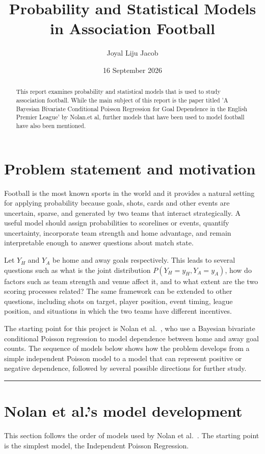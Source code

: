 \documentclass[11pt,a4paper]{amsart}
\title{Probability and Statistical Models in Association Football}
\author{Joyal Liju Jacob}
\date{16 September 2026}
\numberwithin{equation}{section}
\begin{document}
	
\begin{abstract}
This report examines probability and statistical models that is used to study association football. While the main subject of this report is the paper titled 'A Bayesian Bivariate Conditional Poisson Regression for Goal Dependence in the English Premier League' by Nolan.et al, further models that have been used to model football have also been mentioned. 
\end{abstract}

\maketitle
\tableofcontents

\section{Problem statement and motivation}
Football is the most known sports in the world and it provides a natural setting for applying probability because goals, shots, cards and other events are uncertain, sparse, and generated by two teams that interact strategically. A useful model should assign probabilities to scorelines or events, quantify uncertainty, incorporate team strength and home advantage, and remain interpretable enough to answer questions about match state.

Let $Y_H$ and $Y_A$ be home and away goals respectively. This leads to several questions such as what is the joint distribution
$P(Y_H=y_H,Y_A=y_A)$, how do factors such as team strength and venue affect it, and to what extent are the two scoring processes related? The same framework can be extended to other questions, including shots on target, player position, event timing, league position, and situations in which the two teams have different incentives.

The starting point for this project is Nolan et al.~\cite{nolan2026}, who use a Bayesian bivariate conditional Poisson regression to model dependence between home and away goal counts. The sequence of models below shows how the problem develops from a simple independent Poisson model to a model that can represent positive or negative dependence, followed by several possible directions for further study.

\noindent\rule{\textwidth}{0.8pt}

\section{Nolan et al.'s model development}
This section follows the order of models used by Nolan et al.~\cite{nolan2026}. The starting point is the simplest model, the Independent Poisson Regression.
\end{document}
